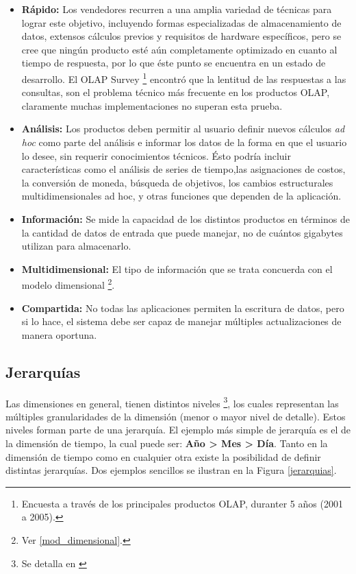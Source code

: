 \documentclass[a4paper,11pt]{article}
\begin{document}
    \begin{itemize}
      \item \textbf{Rápido:} Los vendedores recurren a una amplia variedad de técnicas para lograr este objetivo, incluyendo formas especializadas de
      almacenamiento de datos, extensos cálculos previos y requisitos de hardware específicos, pero se cree que ningún producto esté aún completamente
      optimizado en cuanto al tiempo de respuesta, por lo que éste punto se encuentra en un estado de desarrollo.
      El OLAP Survey \footnote{Encuesta a través de los principales productos OLAP, duranter 5 años (2001 a 2005).} encontró
      que la lentitud de las respuestas a las consultas, son el problema técnico más frecuente en los productos OLAP, claramente muchas implementaciones
      no superan esta prueba.
      \item \textbf{Análisis:} Los productos deben permitir al usuario definir nuevos cálculos \textit{ad hoc} como parte del análisis e informar los datos de la
      forma en que el usuario lo desee, sin requerir conocimientos técnicos. Ésto podría incluir características como el análisis de series de tiempo,las
      asignaciones de costos, la conversión de moneda, búsqueda de objetivos, los cambios estructurales multidimensionales ad hoc, y otras funciones que
      dependen de la aplicación.
      \item \textbf{Información:} Se mide la capacidad de los distintos productos en términos de la cantidad de datos de entrada que puede manejar,
      no de cuántos gigabytes utilizan para almacenarlo.
      \item \textbf{Multidimensional:} El tipo de información que se trata concuerda con el modelo dimensional \footnote{Ver \ref{mod_dimensional}.}.
      \item \textbf{Compartida:} No todas las aplicaciones permiten la escritura de datos, pero si lo hace, el sistema debe ser capaz de manejar múltiples
      actualizaciones de manera oportuna.
    \end{itemize}
     
    
    \subsection{Jerarquías}
    
    Las dimensiones en general, tienen distintos niveles \footnote{Se detalla en \cite[p.~94]{olap_solutions}}, los cuales representan las
    múltiples granularidades de la dimensión (menor o mayor nivel de detalle). Estos niveles forman parte de una jerarquía. El ejemplo más simple de
    jerarquía es el de la dimensión de tiempo, la cual puede ser: \textbf{Año > Mes > Día}. Tanto en la dimensión de
    tiempo como en cualquier otra existe la posibilidad de definir distintas jerarquías. Dos ejemplos sencillos se ilustran en la Figura
    \ref{jerarquias}.
    
\end{document}
